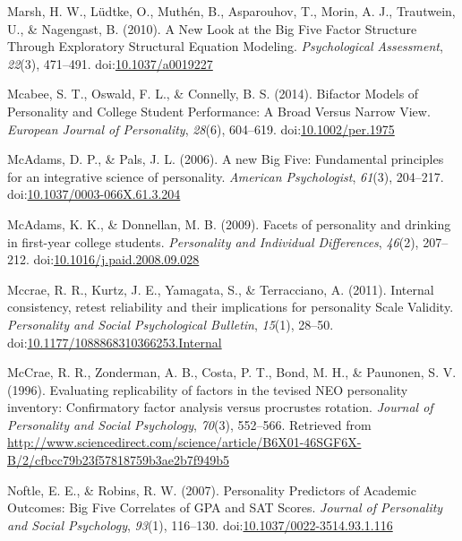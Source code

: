 \documentclass[,man,floatsintext]{apa6}
\begin{document}
\hypertarget{ref-Marsh2010}{}
Marsh, H. W., Lüdtke, O., Muthén, B., Asparouhov, T., Morin, A. J.,
Trautwein, U., \& Nagengast, B. (2010). A New Look at the Big Five
Factor Structure Through Exploratory Structural Equation Modeling.
\emph{Psychological Assessment}, \emph{22}(3), 471--491.
doi:\href{https://doi.org/10.1037/a0019227}{10.1037/a0019227}

\hypertarget{ref-Mcabee2014}{}
Mcabee, S. T., Oswald, F. L., \& Connelly, B. S. (2014). Bifactor Models
of Personality and College Student Performance: A Broad Versus Narrow
View. \emph{European Journal of Personality}, \emph{28}(6), 604--619.
doi:\href{https://doi.org/10.1002/per.1975}{10.1002/per.1975}

\hypertarget{ref-McAdams2006a}{}
McAdams, D. P., \& Pals, J. L. (2006). A new Big Five: Fundamental
principles for an integrative science of personality. \emph{American
Psychologist}, \emph{61}(3), 204--217.
doi:\href{https://doi.org/10.1037/0003-066X.61.3.204}{10.1037/0003-066X.61.3.204}

\hypertarget{ref-McAdams2009}{}
McAdams, K. K., \& Donnellan, M. B. (2009). Facets of personality and
drinking in first-year college students. \emph{Personality and
Individual Differences}, \emph{46}(2), 207--212.
doi:\href{https://doi.org/10.1016/j.paid.2008.09.028}{10.1016/j.paid.2008.09.028}

\hypertarget{ref-Mccrae2011}{}
Mccrae, R. R., Kurtz, J. E., Yamagata, S., \& Terracciano, A. (2011).
Internal consistency, retest reliability and their implications for
personality Scale Validity. \emph{Personality and Social Psychological
Bulletin}, \emph{15}(1), 28--50.
doi:\href{https://doi.org/10.1177/1088868310366253.Internal}{10.1177/1088868310366253.Internal}

\hypertarget{ref-McCrae1996}{}
McCrae, R. R., Zonderman, A. B., Costa, P. T., Bond, M. H., \& Paunonen,
S. V. (1996). Evaluating replicability of factors in the tevised NEO
personality inventory: Confirmatory factor analysis versus procrustes
rotation. \emph{Journal of Personality and Social Psychology},
\emph{70}(3), 552--566. Retrieved from
\url{http://www.sciencedirect.com/science/article/B6X01-46SGF6X-B/2/cfbcc79b23f57818759b3ae2b7f949b5}

\hypertarget{ref-Noftle2007}{}
Noftle, E. E., \& Robins, R. W. (2007). Personality Predictors of
Academic Outcomes: Big Five Correlates of GPA and SAT Scores.
\emph{Journal of Personality and Social Psychology}, \emph{93}(1),
116--130.
doi:\href{https://doi.org/10.1037/0022-3514.93.1.116}{10.1037/0022-3514.93.1.116}
\end{document}
